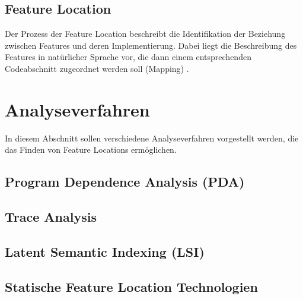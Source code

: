 \documentclass[runningheads,a4paper]{llncs}
\begin{document}
\subsection*{Feature Location}
Der Prozess der Feature Location beschreibt die Identifikation der Beziehung zwischen Features und deren Implementierung. Dabei liegt die Beschreibung des Features in natürlicher Sprache vor, die dann einem entsprechenden Codeabschnitt zugeordnet werden soll (Mapping) \cite{survey}.

\section{Analyseverfahren}

In diesem Abschnitt sollen verschiedene Analyseverfahren vorgestellt werden, die das Finden von Feature Locations ermöglichen.


\subsection*{Program Dependence Analysis (PDA)}

\subsection*{Trace Analysis}

\subsection*{Latent Semantic Indexing (LSI)}





\subsection{Statische Feature Location Technologien}
\end{document}
